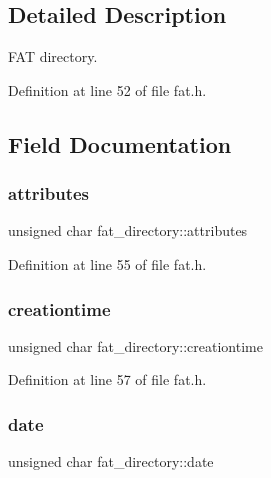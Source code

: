 \subsection{Detailed Description}
F\+AT directory. 

Definition at line 52 of file fat.\+h.



\subsection{Field Documentation}
\mbox{\label{structfat__directory_aa516fe54146f6dcb3bdb75721f5f03d0_aa516fe54146f6dcb3bdb75721f5f03d0}} 
\subsubsection{\texorpdfstring{attributes}{attributes}}
{\footnotesize\ttfamily unsigned char fat\+\_\+directory\+::attributes}



Definition at line 55 of file fat.\+h.

\mbox{\label{structfat__directory_ab588da02acbe9c2caf2f85828a162fcc_ab588da02acbe9c2caf2f85828a162fcc}} 
\subsubsection{\texorpdfstring{creationtime}{creationtime}}
{\footnotesize\ttfamily unsigned char fat\+\_\+directory\+::creationtime}



Definition at line 57 of file fat.\+h.

\mbox{\label{structfat__directory_aa80d47ffcb829a15327d9ac115d29e9d_aa80d47ffcb829a15327d9ac115d29e9d}} 
\subsubsection{\texorpdfstring{date}{date}}
{\footnotesize\ttfamily unsigned char fat\+\_\+directory\+::date}



